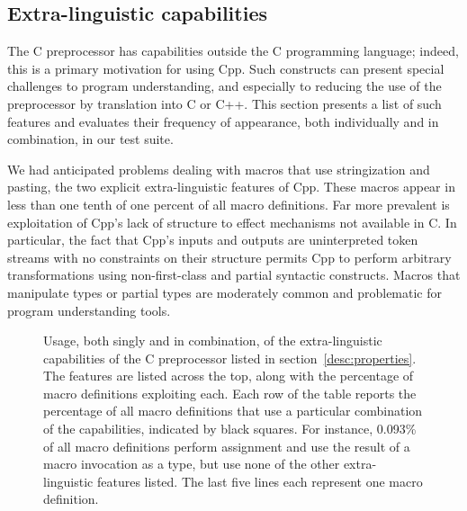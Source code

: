 \documentclass[10pt]{article}
\begin{document}




\subsection{Extra-linguistic capabilities}
\label{sec:extra-linguistic}

The C preprocessor has capabilities outside the C programming language;
indeed, this is a primary motivation for using Cpp.  Such constructs can
present special challenges to program understanding, and especially to
reducing the use of the preprocessor by translation into C or C++.  This
section
presents a list of such features and evaluates their frequency of
appearance, both individually and in combination, in our test suite.

We had anticipated problems dealing with macros that use stringization and
pasting, the two explicit extra-linguistic features of Cpp.  These macros
appear in less than one tenth of one percent of all macro definitions.  Far
more prevalent is exploitation of Cpp's lack of structure to effect
mechanisms not available in C\@.  In particular, the fact that Cpp's inputs
and outputs are uninterpreted token streams with no constraints on their
structure permits Cpp to perform arbitrary transformations using
non-first-class and partial syntactic constructs.  Macros that manipulate
types or partial types are moderately common and problematic for program
understanding tools.

\begin{figure}
  {\small\centerline{}}
  
  \caption{Usage, both singly and in
    combination, of the extra-linguistic capabilities of the C
    preprocessor listed in section~\ref{desc:properties}.  The features are
    listed across the top, along with the percentage of macro definitions
    exploiting each.  Each row of the table reports the percentage of all
    macro definitions that use a particular combination of the
    capabilities, indicated by black squares.  For instance, 0.093\% of all
    macro definitions perform assignment and use the result of a macro
    invocation as a type, but use none of the other extra-linguistic
    features listed.  The last five lines each represent one macro
    definition.}
  \label{fig:subset-properties}
\end{figure}
\end{document}

